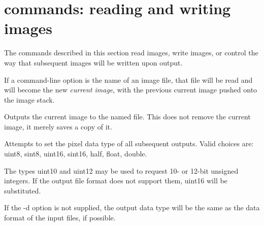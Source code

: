 \begin{comment}
\apiitem{--inplace}
Causes the output to \emph{replace} the input file, rather than create a
new file with a different name.

Without this flag, \oiiotool expects two file names, which will
be used to specify the input and output files, respectively.

But when {\cf --inplace} option is used, any number of file names $\ge 1$ may
be specified, and the image conversion commands are applied to each file
in turn, with the output being saved under the original file name.  This
is useful for applying the same conversion to many files.  

For example, the following example will add the caption ``Hawaii
vacation'' to all JPEG files in the current directory:

\begin{code}
        oiiotool --inplace --adjust-time --caption "Hawaii vacation" *.jpg
\end{code}
\apiend
\end{comment}


\section{\oiiotool commands: reading and writing images}

The commands described in this section read images, write images,
or control the way that subsequent images will be written upon output.

If a command-line option is the name of an image file, that file will
be read and will become the new \emph{current image}, with the previous
current image pushed onto the image stack.
\apiend

Outputs the current image to the named file.  This does not remove the
current image, it merely saves a copy of it.
\apiend


Attempts to set the pixel data type of all subsequent outputs.  Valid
choices are: {\cf uint8}, {\cf sint8}, 
{\cf uint16}, {\cf sint16}, {\cf  half}, {\cf float}, {\cf double}.

The types {\cf uint10} and {\cf uint12} may be used to request 10- or
12-bit unsigned integers.  If the output file format does not support
them, {\cf uint16} will be substituted.

If the {\cf -d} option is not supplied, the output data type will
be the same as the data format of the input files, if possible.

